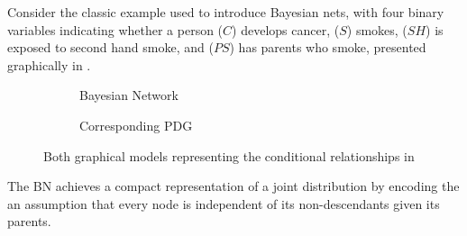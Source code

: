 \documentclass{article}
\newcommand{\MN}{PDG}
\numberwithin{equation}{section}
\begin{document}
	\begin{example}\label{ex:smoking}
		Consider the classic example used to introduce Bayesian nets, with four binary variables indicating whether a person ($C$) develops cancer, ($S$) smokes, ($SH$) is exposed to second hand smoke, and ($PS$) has parents who smoke, presented graphically in .
		\begin{figure*}[ht!]
			\centering
			
			\begin{subfigure}[b]{0.3\textwidth}
				\scalebox{0.9}{
				\begin{tikzcd}[center base, column sep=1.8em, row sep=1em, dpad={fill opacity=0, draw=gray}, 
					ampersand replacement=\&]
				\& S \ar[dr] \\
				PS \ar[ur]\ar[dr] \&\& C \\
				\& SH \ar[ur]
				\end{tikzcd}}
				\caption{Bayesian Network}
				\label{subfig:smoking-bn}
			\end{subfigure}%
			\hspace{2em}\vline\hspace{2em}
			\begin{subfigure}[b]{0.5\textwidth}
				\caption{Corresponding \MN}
				\label{subfig:smoking-pdg}
			\end{subfigure}
		
			\caption{Both graphical models representing the conditional relationships in }
			\label{fig:smoking-bn+pdg}
		\end{figure*}
		
		The BN achieves a compact representation of a joint distribution by encoding the an assumption that every node is independent of its non-descendants given its parents.
	

\end{example}
\end{document}
